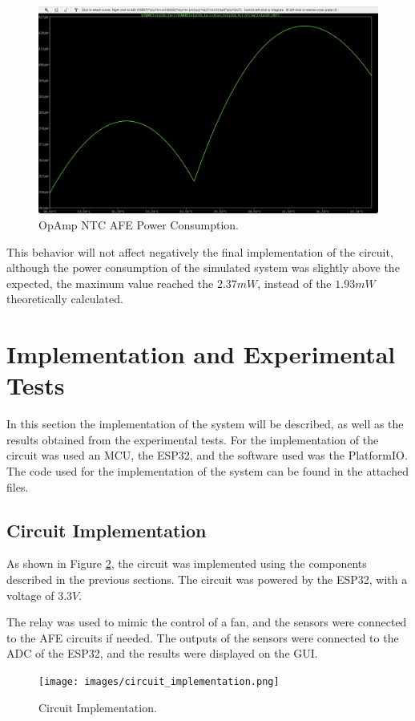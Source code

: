 \documentclass[12pt]{article}
\begin{document}
    \begin{figure}[H] 
        \centering
        \includegraphics*[scale = 0.3]{images/PowerAmpop.png}
        \caption{OpAmp NTC AFE Power Consumption.}
        \label{OpAmpNTC}
    \end{figure}

    This behavior will not affect negatively the final implementation of the circuit, although the power consumption of the simulated system was slightly above the expected, the maximum value reached the $2.37mW$, instead of the $1.93mW$ theoretically calculated.
    
\section{Implementation and Experimental Tests}

In this section the implementation of the system will be described, as well as the results obtained from the experimental tests. For the implementation of the circuit was used an MCU, the ESP32, and the software used was the PlatformIO. The code used for the implementation of the system can be found in the attached files.

\subsection{Circuit Implementation}

As shown in  Figure \ref{fig:circuit-implementation}, the circuit was implemented using the components described in the previous sections. The circuit was powered by the ESP32, with a voltage of $3.3V$. 

The relay was used to mimic the control of a fan, and the sensors were connected to the AFE circuits if needed. The outputs of the sensors were connected to the ADC of the ESP32, and the results were displayed on the GUI.
\begin{figure}[H] 
    \centering
    \texttt{[image: images/circuit\_implementation.png]}
    \caption{Circuit Implementation.}
    \label{fig:circuit-implementation}
\end{figure}
\end{document}
